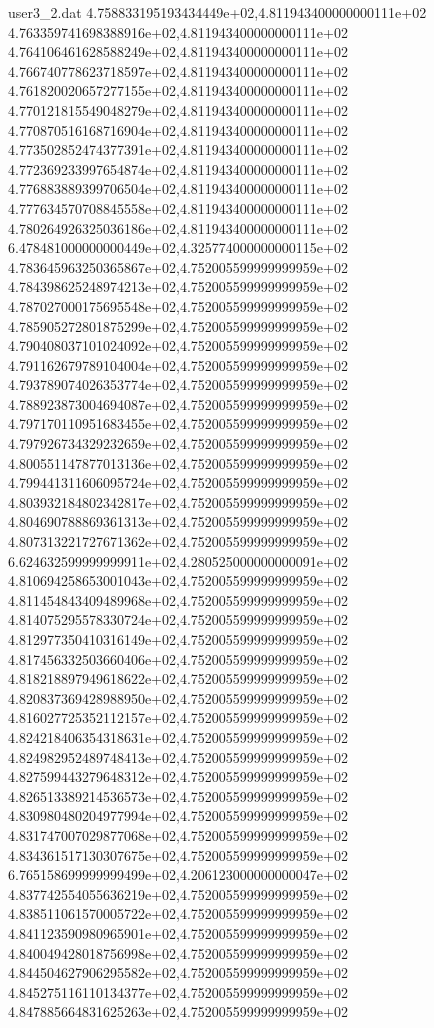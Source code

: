 \begin{filecontents}{user3_2.dat}
4.758833195193434449e+02,4.811943400000000111e+02
4.763359741698388916e+02,4.811943400000000111e+02
4.764106461628588249e+02,4.811943400000000111e+02
4.766740778623718597e+02,4.811943400000000111e+02
4.761820020657277155e+02,4.811943400000000111e+02
4.770121815549048279e+02,4.811943400000000111e+02
4.770870516168716904e+02,4.811943400000000111e+02
4.773502852474377391e+02,4.811943400000000111e+02
4.772369233997654874e+02,4.811943400000000111e+02
4.776883889399706504e+02,4.811943400000000111e+02
4.777634570708845558e+02,4.811943400000000111e+02
4.780264926325036186e+02,4.811943400000000111e+02
6.478481000000000449e+02,4.325774000000000115e+02
4.783645963250365867e+02,4.752005599999999959e+02
4.784398625248974213e+02,4.752005599999999959e+02
4.787027000175695548e+02,4.752005599999999959e+02
4.785905272801875299e+02,4.752005599999999959e+02
4.790408037101024092e+02,4.752005599999999959e+02
4.791162679789104004e+02,4.752005599999999959e+02
4.793789074026353774e+02,4.752005599999999959e+02
4.788923873004694087e+02,4.752005599999999959e+02
4.797170110951683455e+02,4.752005599999999959e+02
4.797926734329232659e+02,4.752005599999999959e+02
4.800551147877013136e+02,4.752005599999999959e+02
4.799441311606095724e+02,4.752005599999999959e+02
4.803932184802342817e+02,4.752005599999999959e+02
4.804690788869361313e+02,4.752005599999999959e+02
4.807313221727671362e+02,4.752005599999999959e+02
6.624632599999999911e+02,4.280525000000000091e+02
4.810694258653001043e+02,4.752005599999999959e+02
4.811454843409489968e+02,4.752005599999999959e+02
4.814075295578330724e+02,4.752005599999999959e+02
4.812977350410316149e+02,4.752005599999999959e+02
4.817456332503660406e+02,4.752005599999999959e+02
4.818218897949618622e+02,4.752005599999999959e+02
4.820837369428988950e+02,4.752005599999999959e+02
4.816027725352112157e+02,4.752005599999999959e+02
4.824218406354318631e+02,4.752005599999999959e+02
4.824982952489748413e+02,4.752005599999999959e+02
4.827599443279648312e+02,4.752005599999999959e+02
4.826513389214536573e+02,4.752005599999999959e+02
4.830980480204977994e+02,4.752005599999999959e+02
4.831747007029877068e+02,4.752005599999999959e+02
4.834361517130307675e+02,4.752005599999999959e+02
6.765158699999999499e+02,4.206123000000000047e+02
4.837742554055636219e+02,4.752005599999999959e+02
4.838511061570005722e+02,4.752005599999999959e+02
4.841123590980965901e+02,4.752005599999999959e+02
4.840049428018756998e+02,4.752005599999999959e+02
4.844504627906295582e+02,4.752005599999999959e+02
4.845275116110134377e+02,4.752005599999999959e+02
4.847885664831625263e+02,4.752005599999999959e+02

\end{filecontents}
